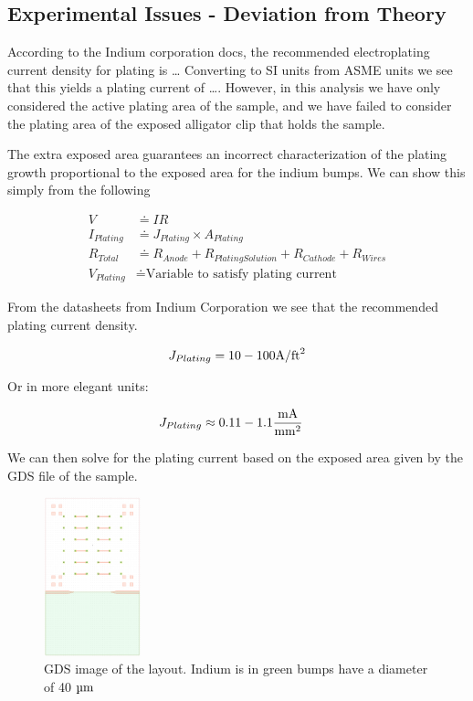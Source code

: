 \subsection{Experimental Issues - Deviation from Theory}

According to the Indium corporation docs, the recommended electroplating current density for plating is \dots
Converting to SI units from ASME units we see that this yields a plating current of \dots. However, in this analysis we have only considered the active plating area of the sample, and we have failed to consider the plating area of the exposed alligator clip that holds the sample.

The extra exposed area guarantees an incorrect characterization of the plating growth proportional to the exposed area for the indium bumps. We can show this simply from the following

\begin{equation}\tag{A}
    \begin{split}
        V &\doteq I R \\
        I_{Plating} &\doteq J_{Plating} \times A_{Plating} \\
        R_{Total} &\doteq R_{Anode} + R_{Plating Solution} + R_{Cathode} + R_{Wires} \\
        V_{Plating} &\doteq \text{Variable to satisfy plating current}
    \end{split}
\end{equation}

From the datasheets from Indium Corporation \cite{indiumCorpPlating} we see that the recommended plating current density.

$$
    J_{Plating} = 10-100 \jufeet
$$

Or in more elegant units:

\begin{equation}\notag
    \begin{split}
        J_{Plating} &\approx 0.11-1.1 \junits
    \end{split}
\end{equation}


We can then solve for the plating current based on the exposed area given by the GDS file of the sample.


\begin{figure}
    \centering
    \includegraphics[width=0.25\textwidth]{Main/Ch1/GDS_V1.png}
    \caption{GDS image of the layout. Indium is in green bumps have a diameter of 40 $\um$}
    \vspace{.1cm}
\end{figure}



